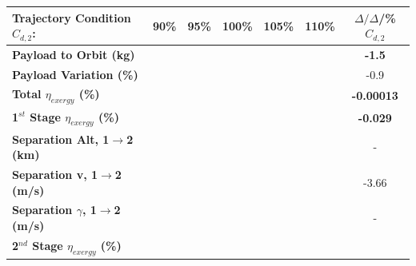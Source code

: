 \begin{table}[ht]
	\centering
	\begin{tabular}{l c c c c c c} 
		\hline \textbf{Trajectory Condition}   \qquad  $C_{d,2}$:
		&90\%
		&95\%
		&100\%
		&105\%
		&110\%
		& $\Delta/\Delta$/\%$C_{d,2}$
		\\
		\hline \textbf{Payload to Orbit (kg)}
		& \textbf{\PayloadToOrbitCdNinety}
		& \textbf{\PayloadToOrbitCdNinetyFive}
		& \textbf{\PayloadToOrbitCdStandard}
		& \textbf{\PayloadToOrbitCdOneHundredFive}
		& \textbf{\PayloadToOrbitCdOneHundredTen}
		&\textbf{-1.5}
		\\
		\textbf{Payload Variation (\%)}
		& \PayloadVarCdNinety
		& \PayloadVarCdNinetyFive
		& \PayloadVarCdStandard
		& \PayloadVarCdOneHundredFive
		& \PayloadVarCdOneHundredTen
		&-0.9
		\\
		\textbf{Total $\eta_{exergy}$ (\%)}
		& \textbf{\totalExergyEffCdNinety}
		& \textbf{\totalExergyEffCdNinetyFive}
		& \textbf{\totalExergyEffCdStandard}
		& \textbf{\totalExergyEffCdOneHundredFive}
		& \textbf{\totalExergyEffCdOneHundredTen}
		& \textbf{-0.00013}
		\\
		\hline 
		\textbf{1$^{st}$ Stage $\eta_{exergy}$ (\%)}
		& \textbf{\firstExergyEffCdNinety}
		& \textbf{\firstExergyEffCdNinetyFive}
		& \textbf{\firstExergyEffCdStandard}
		& \textbf{\firstExergyEffCdOneHundredFive}
		& \textbf{\firstExergyEffCdOneHundredTen}
		& \textbf{-0.029}
		\\
		\textbf{Separation Alt, 1$\rightarrow$2 (km)}
		& \firstsecondSeparationAltCdNinety
		& \firstsecondSeparationAltCdNinetyFive
		& \firstsecondSeparationAltCdStandard
		& \firstsecondSeparationAltCdOneHundredFive
		& \firstsecondSeparationAltCdOneHundredTen
		& -
		\\
		\textbf{Separation v, 1$\rightarrow$2 (m/s)}
		& \firstsecondSeparationvCdNinety
		& \firstsecondSeparationvCdNinetyFive
		& \firstsecondSeparationvCdStandard
		& \firstsecondSeparationvCdOneHundredFive
		& \firstsecondSeparationvCdOneHundredTen
		&-3.66
		\\
		\textbf{Separation $\gamma$, 1$\rightarrow$2 (m/s)}
		& \firstsecondSeparationgammaCdNinety
		& \firstsecondSeparationgammaCdNinetyFive
		& \firstsecondSeparationgammaCdStandard
		& \firstsecondSeparationgammaCdOneHundredFive
		& \firstsecondSeparationgammaCdOneHundredTen
		& -
		\\
		\hline 
		\textbf{2$^{nd}$ Stage $\eta_{exergy}$ (\%)}
		& \textbf{\secondExergyEffCdNinety}
		& \textbf{\secondExergyEffCdNinetyFive}
		& \textbf{\secondExergyEffCdStandard}

\end{tabular}
\end{table}
